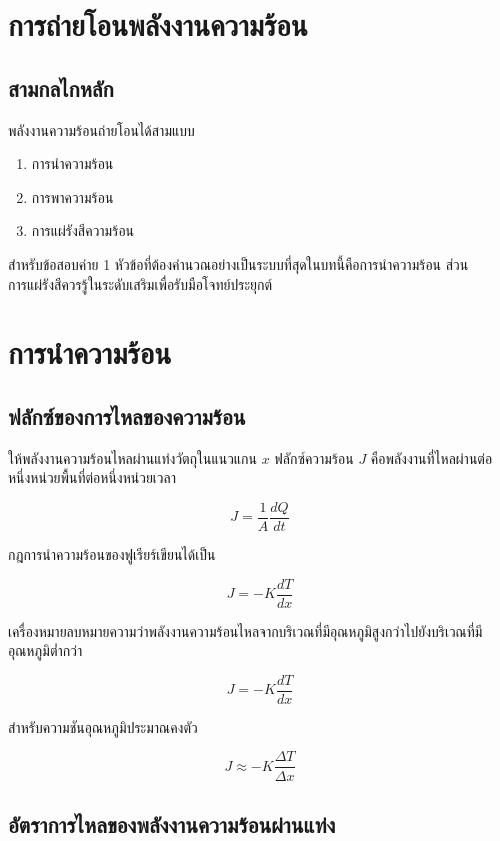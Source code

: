 \section{การถ่ายโอนพลังงานความร้อน}

\subsection{สามกลไกหลัก}

พลังงานความร้อนถ่ายโอนได้สามแบบ

\begin{enumerate}
    \item การนำความร้อน
    \item การพาความร้อน
    \item การแผ่รังสีความร้อน
\end{enumerate}

สำหรับข้อสอบค่าย 1 หัวข้อที่ต้องคำนวณอย่างเป็นระบบที่สุดในบทนี้คือการนำความร้อน ส่วนการแผ่รังสีควรรู้ในระดับเสริมเพื่อรับมือโจทย์ประยุกต์

\section{การนำความร้อน}

\subsection{ฟลักซ์ของการไหลของความร้อน}

ให้พลังงานความร้อนไหลผ่านแท่งวัตถุในแนวแกน $x$ ฟลักซ์ความร้อน $J$ คือพลังงานที่ไหลผ่านต่อหนึ่งหน่วยพื้นที่ต่อหนึ่งหน่วยเวลา

\[
J=\frac{1}{A}\frac{dQ}{dt}
\]

กฎการนำความร้อนของฟูเรียร์เขียนได้เป็น

\[
J=-K\frac{dT}{dx}
\]

เครื่องหมายลบหมายความว่าพลังงานความร้อนไหลจากบริเวณที่มีอุณหภูมิสูงกว่าไปยังบริเวณที่มีอุณหภูมิต่ำกว่า

\begin{tcolorbox}[title=ฟลักซ์ความร้อน]
\[
\boxed{J=-K\frac{dT}{dx}}
\]

สำหรับความชันอุณหภูมิประมาณคงตัว

\[
\boxed{J\approx-K\frac{\Delta T}{\Delta x}}
\]
\end{tcolorbox}

\subsection{อัตราการไหลของพลังงานความร้อนผ่านแท่ง}

